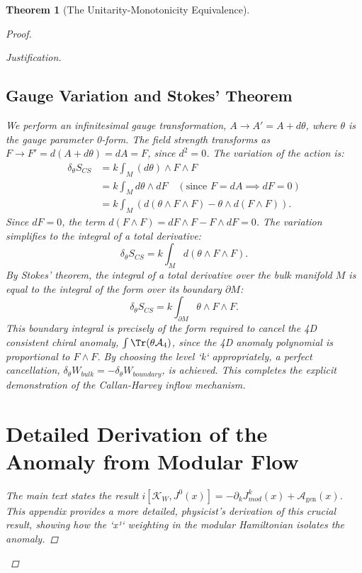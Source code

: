 \documentclass[11pt, letterpaper]{report}
\theoremstyle{plain} %
\newtheorem{theorem}{Theorem}[chapter]
\theoremstyle{definition} %
\theoremstyle{remark} %
\newcommand{\BulkM}{M}
\newcommand{\BoundaryM}{\partial\BulkM}
\newcommand{\ModularK}{\mathcal{K}}
\newcommand{\AnomPoly}{\mathcal{A}}
\begin{document}
\begin{theorem}[The Unitarity-Monotonicity Equivalence]
\begin{proof}
\begin{proof}[Justification]
\subsection{Gauge Variation and Stokes' Theorem}
We perform an infinitesimal gauge transformation, $A \to A' = A + d\theta$, where $\theta$ is the gauge parameter 0-form. The field strength transforms as $F \to F' = d(A+d\theta) = dA = F$, since $d^2=0$.
The variation of the action is:
\begin{align}
    \delta_\theta S_{CS} &= k \int_{\BulkM} (d\theta) \wedge F \wedge F \\
    &= k \int_{\BulkM} d\theta \wedge dF \quad (\text{since } F=dA \implies dF=0) \\
    &= k \int_{\BulkM} (d(\theta \wedge F \wedge F) - \theta \wedge d(F \wedge F)).
\end{align}
Since $dF=0$, the term $d(F \wedge F) = dF \wedge F - F \wedge dF = 0$. The variation simplifies to the integral of a total derivative:
\begin{equation}
    \delta_\theta S_{CS} = k \int_{\BulkM} d(\theta \wedge F \wedge F).
\end{equation}
By Stokes' theorem, the integral of a total derivative over the bulk manifold $\BulkM$ is equal to the integral of the form over its boundary $\BoundaryM$:
\begin{equation}
    \delta_\theta S_{CS} = k \int_{\BoundaryM} \theta \wedge F \wedge F.
\end{equation}
This boundary integral is precisely of the form required to cancel the 4D consistent chiral anomaly, $\int \Tr(\theta \mathcal{A}_4)$, since the 4D anomaly polynomial is proportional to $F \wedge F$. By choosing the level `k` appropriately, a perfect cancellation, $\delta_\theta W_{bulk} = -\delta_\theta W_{boundary}$, is achieved. This completes the explicit demonstration of the Callan-Harvey inflow mechanism.

\section{Detailed Derivation of the Anomaly from Modular Flow}
\label{app:modular_commutator_derivation}

The main text states the result $i[\ModularK_W, J^0(x)] = -\partial_k J^k_{mod}(x) + \AnomPoly_{\text{gen}}(x)$. This appendix provides a more detailed, physicist's derivation of this crucial result, showing how the `x¹` weighting in the modular Hamiltonian isolates the anomaly.


\end{proof}
\end{proof}
\end{theorem}
\end{document}
